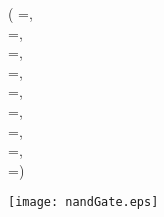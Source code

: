 \label{func:pyscriptElectronicsNand}
\begin{funcDesc}
\item[] (%
	=,\\
	=,\\
	=,\\
	=,\\
	=,\\
	=,\\
	=,\\
	=,\\
	=)

\begin{funcExCode}

\end{funcExCode}

\begin{funcExOut}
\texttt{[image: nandGate.eps]}
\end{funcExOut}

\end{funcDesc}

